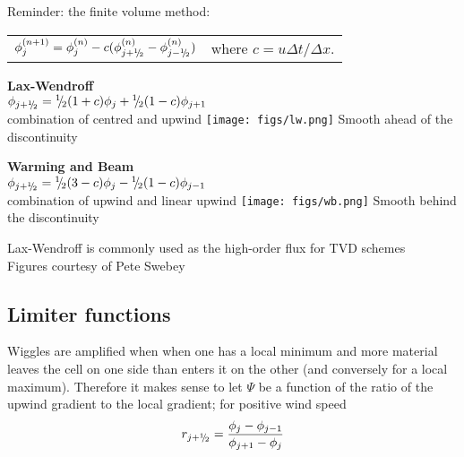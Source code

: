 Reminder: the finite volume method:

\begin{center}\begin{tabular}{lr}
$\phi_j^{(n+1)} = \phi_j^{(n)} - c(\phi_{j+{^1\negthickspace/\negthinspace_2}}^{(n)}-\phi_{j-{^1\negthickspace/\negthinspace_2}}^{(n)})$
& where $c=u\Delta t/\Delta x$.
\end{tabular}\end{center}

\begin{minipage}{0.49\linewidth}\centering
{\bf Lax-Wendroff}\\
$\phi_{j+{^1\negthickspace/\negthinspace_2}} = {^1\negthickspace/\negthinspace_2}(1+c)\phi_j + {^1\negthickspace/\negthinspace_2}(1-c)\phi_{j+1}$\\
combination of centred and upwind 
\texttt{[image: figs/lw.png]}
Smooth ahead of the discontinuity
\end{minipage}
\hfill
\begin{minipage}{0.49\linewidth}\centering
{\bf Warming and Beam}\\
$\phi_{j+{^1\negthickspace/\negthinspace_2}} = {^1\negthickspace/\negthinspace_2}(3-c)\phi_j - {^1\negthickspace/\negthinspace_2}(1-c)\phi_{j-1}$\\
combination of upwind and linear upwind
\texttt{[image: figs/wb.png]}
Smooth behind the discontinuity
\end{minipage}

Lax-Wendroff is commonly used as the high-order flux for TVD schemes\\
Figures courtesy of Pete Swebey

\clearpage
\subsection{Limiter functions}

Wiggles are amplified when when one has a local minimum and more material leaves the cell on one side than enters it on the other (and conversely for a local maximum). Therefore it makes sense to let $\Psi$ be a function
of the ratio of the upwind gradient to the local gradient; for positive wind speed
\begin{equation*}
r_{j+{^1\negthickspace/\negthinspace_2}} = \frac{\phi_j - \phi_{j-1}}{\phi_{j+1} - \phi_j}
\end{equation*}

